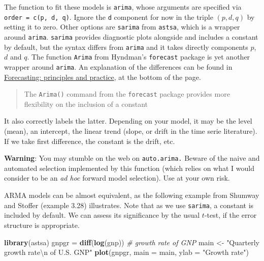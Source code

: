 \documentclass[]{book}
\newenvironment{Shaded}{\begin{snugshade}}{\end{snugshade}}
\newcommand{\CharTok}[1]{\textcolor[rgb]{0.31,0.60,0.02}{#1}}
\newcommand{\CommentTok}[1]{\textcolor[rgb]{0.56,0.35,0.01}{\textit{#1}}}
\newcommand{\DataTypeTok}[1]{\textcolor[rgb]{0.13,0.29,0.53}{#1}}
\newcommand{\KeywordTok}[1]{\textcolor[rgb]{0.13,0.29,0.53}{\textbf{#1}}}
\newcommand{\NormalTok}[1]{#1}
\newcommand{\StringTok}[1]{\textcolor[rgb]{0.31,0.60,0.02}{#1}}
\begin{document}
The function to fit these models is \texttt{arima}, whose arguments are
specified via \texttt{order\ =\ c(p,\ d,\ q)}. Ignore the \texttt{d}
component for now in the triple \((p, d, q)\) by setting it to zero.
Other options are \texttt{sarima} from \texttt{astsa}, which is a
wrapper around \texttt{arima}. \texttt{sarima} provides diagnostic plots
alongside and includes a constant by default, but the syntax differs
from \texttt{arima} and it takes directly components \(p\), \(d\) and
\(q\). The function \texttt{Arima} from Hyndman's \texttt{forecast}
package is yet another wrapper around \texttt{arima}. An explanation of
the differences can be found in
\href{https://www.otexts.org/fpp/8/7}{Forecasting: principles and
practice}, at the bottom of the page.

\begin{quote}
The \texttt{Arima()} command from the \texttt{forecast} package provides
more flexibility on the inclusion of a constant
\end{quote}

It also correctly labels the latter. Depending on your model, it may be
the level (mean), an intercept, the linear trend (slope, or drift in the
time serie literature). If we take first difference, the constant is the
drift, etc.

\textbf{Warning}: You may stumble on the web on \texttt{auto.arima.}
Beware of the naive and automated selection implemented by this function
(which relies on what I would consider to be an \emph{ad hoc} forward
model selection). Use at your own risk.

ARMA models can be almost equivalent, as the following example from
Shumway and Stoffer (example 3.28) illustrates. Note that as we use
\texttt{sarima}, a constant is included by default. We can assess its
significance by the usual \(t\)-test, if the error structure is
appropriate.

\begin{Shaded}
\begin{Highlighting}[]
\KeywordTok{library}\NormalTok{(astsa)}
\NormalTok{gnpgr =}\StringTok{ }\KeywordTok{diff}\NormalTok{(}\KeywordTok{log}\NormalTok{(gnp))  }\CommentTok{# growth rate of GNP}
\NormalTok{main <-}\StringTok{ "Quarterly growth rate}\CharTok{\textbackslash{}n}\StringTok{ of U.S. GNP"}
\KeywordTok{plot}\NormalTok{(gnpgr, }\DataTypeTok{main =}\NormalTok{ main, }\DataTypeTok{ylab =} \StringTok{"Growth rate"}\NormalTok{)}
\end{Highlighting}
\end{Shaded}
\end{document}
